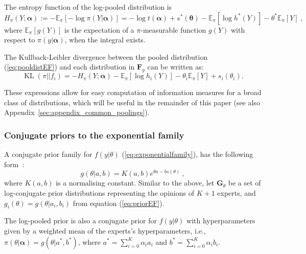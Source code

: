 \documentclass[a4paper, notitlepage, 11pt]{article}
\begin{document}
The entropy function of the log-pooled distribution is
\begin{equation}
\label{eq:entropydistEF}
H_\pi(Y; \boldsymbol\alpha) :=  - \mathbb{E}_{\pi}\left[-\log \pi(Y | \boldsymbol\alpha) \right] = -\log t(\boldsymbol\alpha) + s^\ast (\boldsymbol\theta) - \mathbb{E}_\pi[\log h^\ast (Y)] - \theta^\ast \mathbb{E}_\pi[Y] \: ,
\end{equation}
where $\mathbb{E}_{\pi}\left[ g(Y) \right]$ is the expectation of a $\pi$-measurable function $g(Y)$ with respect to $\pi( y | \boldsymbol\alpha)$, when the integral exists.

The Kullback-Leibler divergence between the pooled distribution (\ref{eq:pooldistEF}) and each distribution in $\mathbf{F}_{y}$ can be written as:
\begin{equation}
\label{eq:KLdistEF}
\operatorname{KL}(\pi || f_i )  =  - H_\pi(Y; \boldsymbol\alpha) - \mathbb{E}_\pi[\log h_i(Y)] - \theta_i \mathbb{E}_\pi[Y] + s_i(\theta_i).
\end{equation}

These expressions allow for easy computation of information measures for a broad class of distributions, which will be useful in the remainder of this paper (see also Appendix~\ref{sec:appendix_common_poolings}).

\subsubsection{Conjugate priors to the exponential family}
\label{sec:conjugexpofamily}

A conjugate prior family for $f(y|\theta)$ (\ref{eq:exponentialfamily}), has the following form~\citep{Diaconis1979}:
\begin{equation}
\label{eq:priorEF}
g(\theta | a, b) = K(a,b) e^{\theta a - b s(\theta)} \: ,
\end{equation}
where $K(a,b)$ is a normalising constant.
Similar to the above, let $\mathbf{G}_{\theta}$ be a set of log-conjugate prior distributions representing the opinions of $K+1$ experts, and $g_i(\theta) = g(\theta | a_i, b_i)$ from equation (\ref{eq:priorEF}).

The log-pooled prior is also a conjugate prior for $f(y|\theta)$ with hyperparameters given by a weighted mean of the experts's hyperparameters, i.e., $\pi(\theta|\boldsymbol\alpha) = g(\theta | a^*, b^* )$, where $a^* = \sum_{i=0}^K \alpha_i a_i$ and $b^* = \sum_{i=0}^K \alpha_i b_i$.
\end{document}
